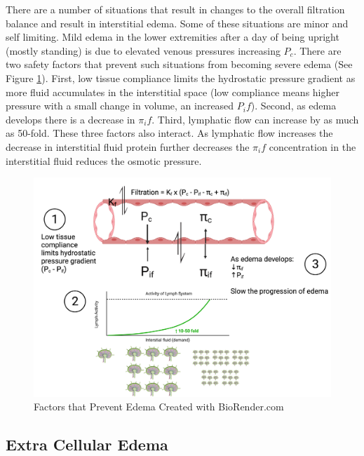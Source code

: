 There are a number of situations that result in changes to the overall filtration balance and result in interstitial edema. Some of these situations are minor and self limiting. Mild edema in the lower extremities after a day of being upright (mostly standing) is due to elevated venous pressures increasing $P_c$. There are two safety factors that prevent such situations from becoming severe edema (See Figure \ref{fig:Factors_Prevent_Edema}). First, low tissue compliance limits the hydrostatic pressure gradient as more fluid accumulates in the interstitial space (low compliance means higher pressure with a small change in volume, an increased $P_if$). Second, as edema develops there is a decrease in $\pi_if$. Third, lymphatic flow can increase by as much as 50-fold. These three factors also interact. As lymphatic flow increases the decrease in interstitial fluid protein further decreases the $\pi_if$ concentration in the interstitial fluid reduces the osmotic pressure.

\begin{figure}[!h]
    \centering
    \includegraphics[width=1\linewidth]{./figure/Factors_Prevent_Edema.png}
    \caption{Factors that Prevent Edema \footnotesize{Created with BioRender.com}}
    \label{fig:Factors_Prevent_Edema}
\end{figure}

\subsection{Extra Cellular Edema}

